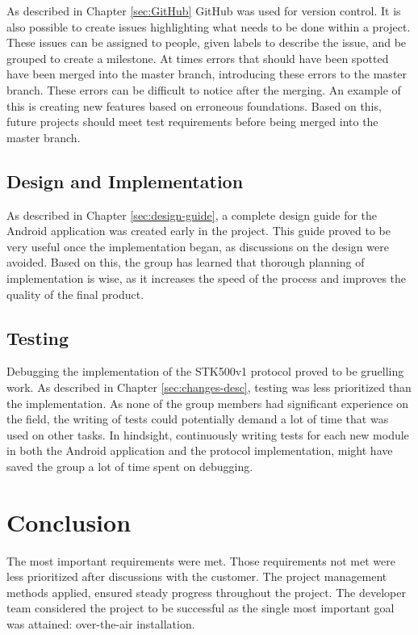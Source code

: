 	As described in Chapter \ref{sec:GitHub} GitHub was used for version control. It is also possible to create issues highlighting what needs to be done within a project. These issues can be assigned to people, given labels to describe the issue, and be grouped to create a milestone. At times errors that should have been spotted have been merged into the master branch, introducing these errors to the master branch. These errors can be difficult to notice after the merging. An example of this is creating new features based on erroneous foundations. Based on this, future projects should meet test requirements before being merged into the master branch. \\

	\subsection{Design and Implementation}
	As described in Chapter \ref{sec:design-guide}, a complete design guide for the Android application was created early in the project. This guide proved to be very useful once the implementation began, as discussions on the design were avoided. Based on this, the group has learned that thorough planning of implementation is wise, as it increases the speed of the process and improves the quality of the final product.

	\subsection{Testing}
	Debugging the implementation of the STK500v1 protocol proved to be gruelling work. As described in Chapter \ref{sec:changes-desc}, testing was less prioritized than the implementation. As none of the group members had significant experience on the field, the writing of tests could potentially demand a lot of time that was used on other tasks. In hindsight, continuously writing tests for each new module in both the Android application and the protocol implementation, might have saved the group a lot of time spent on debugging.

	\section{Conclusion}
	The most important requirements were met. Those requirements not met were less prioritized after discussions with the customer. The project management methods applied, ensured steady progress throughout the project. The developer team considered the project to be successful as the single most important goal was attained: over-the-air installation.
